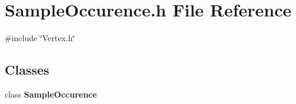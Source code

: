 \section{Sample\+Occurence.\+h File Reference}
\label{SampleOccurence_8h}
{\ttfamily \#include \char`\"{}Vertex.\+h\char`\"{}}\newline
\subsection*{Classes}
\begin{DoxyCompactItemize}
\item 
class \textbf{ Sample\+Occurence}
\end{DoxyCompactItemize}
